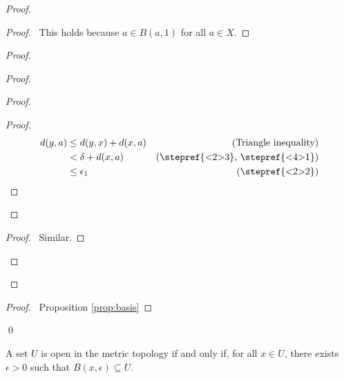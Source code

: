 \begin{proof}
  \pf
  \begin{proof}
    \pf\ This holds because $a \in B(a,1)$ for all $a \in X$.
  \end{proof}
  \begin{proof}
    \begin{proof}
      \begin{proof}
        \begin{proof}
          \pf
          \begin{align*}
            d(y, a) & \leq d(y, x) + d(x, a) & (\text{Triangle inequality})\\
            & < \delta + d(x, a) & (\text{\stepref{<2>3}, \stepref{<4>1}})\\
            & \leq \epsilon_1 & (\text{\stepref{<2>2}})
          \end{align*}
        \end{proof}
      \end{proof}
      \begin{proof}
        \pf\ Similar.
      \end{proof}
    \end{proof}
  \end{proof}
  \qedstep
  \begin{proof}
    \pf\ Proposition \ref{prop:basis}
  \end{proof}
  \qed
\end{proof}

\begin{prop}
  \label{prop:metric:open}
  A set $U$ is open in the metric topology if and only if, for all $x \in U$, there exists $\epsilon > 0$ such that $B(x, \epsilon) \subseteq U$.
\end{prop}

